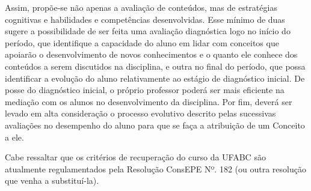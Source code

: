 Assim, propõe-se não apenas a avaliação de conteúdos, mas de estratégias cognitivas e
habilidades e competências desenvolvidas. Esse mínimo de duas sugere a possibilidade de ser feita uma avaliação diagnóstica logo no início do período, que identifique a capacidade do aluno em lidar com conceitos que apoiarão o desenvolvimento de novos conhecimentos e o quanto ele conhece dos conteúdos a serem discutidos na disciplina, e outra no final do período, que possa identificar a evolução do aluno relativamente ao estágio de diagnóstico inicial. De posse do diagnóstico inicial, o próprio professor poderá ser mais eficiente na mediação com os alunos no desenvolvimento da disciplina. Por fim, deverá ser levado em alta consideração o processo evolutivo descrito pelas sucessivas avaliações no desempenho do aluno para que se faça a atribuição de um Conceito a ele.

Cabe ressaltar que os critérios de recuperação do curso da UFABC são atualmente regulamentados pela Resolução ConsEPE Nº. 182 (ou outra resolução que venha a substituí-la).



